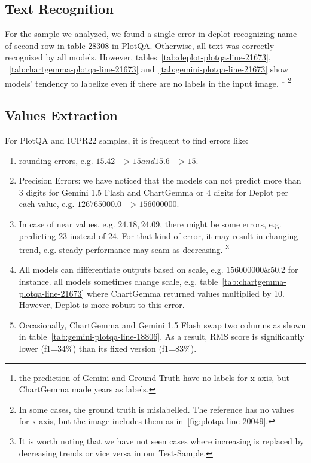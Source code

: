 \documentclass[
	letterpaper, %
]{jdf}
\begin{document}
\subsection{Text Recognition}\label{ssect:qualitative-text-recognition}
For the sample we analyzed, we found a single error in deplot recognizing name of second row in table 28308 in PlotQA.
Otherwise, all text was correctly recognized by all models.
However, tables~\ref{tab:deplot-plotqa-line-21673}, ~\ref{tab:chartgemma-plotqa-line-21673} and~\ref{tab:gemini-plotqa-line-21673} show models' tendency to labelize even if there are no labels in the input image.
\footnote{the prediction of Gemini and Ground Truth have no labels for x-axis, but ChartGemma made years as labels.}
\footnote{In some cases, the ground truth is mislabelled. The reference has no values for x-axis, but the image includes them as in~\ref{fig:plotqa-line-20049}.}

\subsection{Values Extraction}\label{ssect:values-extraction}
For PlotQA and ICPR22 samples, it is frequent to find errors like:
\begin{enumerate}
     \item rounding errors, e.g. $15.42->15 and 15.6->15$.
     \item Precision Errors: we have noticed that the models can not predict more than 3 digits for Gemini 1.5 Flash and ChartGemma or 4 digits for Deplot per each value, e.g. $126765000.0->156000000$.
     \item In case of near values, e.g. $24.18, 24.09$, there might be some errors, e.g. predicting $23$ instead of $24$.
       For that kind of error, it may result in changing trend, e.g. steady performance may seam as decreasing.
       \footnote{It is worth noting that we have not seen cases where increasing is replaced by decreasing trends or vice versa in our Test-Sample.}
       \item All models can differentiate outputs based on scale, e.g. $156000000 \& 50.2$ for instance.
all models sometimes change scale, e.g. table~\ref{tab:chartgemma-plotqa-line-21673} where ChartGemma returned values multiplied by 10.
However, Deplot is more robust to this error.
       \item Occasionally, ChartGemma and Gemini 1.5 Flash swap two columns as shown in table~\ref{tab:gemini-plotqa-line-18806}.
         As a result, RMS score is significantly lower (f1=$34\%$) than its fixed version (f1=$83\%$).
       \end{enumerate}
\end{document}
